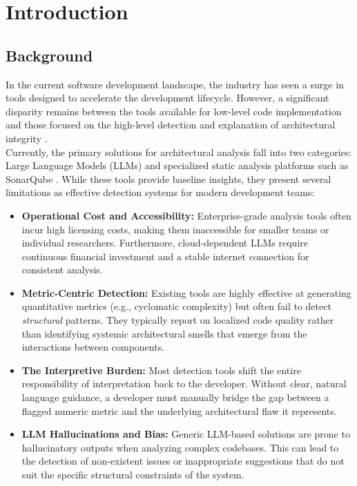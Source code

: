 \chapter{Introduction}
\label{chap:introduction}

\section{Background}
\label{section:background}

In the current software development landscape, the industry has seen a surge in tools designed to accelerate the development lifecycle. However, a significant disparity remains between the tools available for low-level code implementation and those focused on the high-level detection and explanation of architectural integrity \cite{Lenhard2017}.
\\

Currently, the primary solutions for architectural analysis fall into two categories: Large Language Models (LLMs) and specialized static analysis platforms such as SonarQube \cite{SonarQube}. While these tools provide baseline insights, they present several limitations as effective detection systems for modern development teams:

\begin{itemize}
    \item \textbf{Operational Cost and Accessibility:} Enterprise-grade analysis tools often incur high licensing costs, making them inaccessible for smaller teams or individual researchers. Furthermore, cloud-dependent LLMs require continuous financial investment and a stable internet connection for consistent analysis.

    \item \textbf{Metric-Centric Detection:} Existing tools are highly effective at generating quantitative metrics (e.g., cyclomatic complexity) but often fail to detect \textit{structural} patterns. They typically report on localized code quality rather than identifying systemic architectural smells that emerge from the interactions between components.

    \item \textbf{The Interpretive Burden:} Most detection tools shift the entire responsibility of interpretation back to the developer. Without clear, natural language guidance, a developer must manually bridge the gap between a flagged numeric metric and the underlying architectural flaw it represents.

    \item \textbf{LLM Hallucinations and Bias:} Generic LLM-based solutions are prone to hallucinatory outputs when analyzing complex codebases. This can lead to the detection of non-existent issues or inappropriate suggestions that do not suit the specific structural constraints of the system.
\end{itemize}

